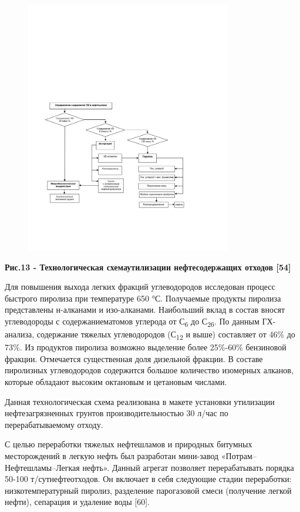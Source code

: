 \begin{figure}[H]
	\centering
	\includegraphics[width=0.8\textwidth]{media/chem2/image76}
	\caption*{}
\end{figure}


{\bfseries Рис.13 - Технологическая схемаутилизации нефтесодержащих
отходов {[}54{]}}

Для повышения выхода легких фракций углеводородов исследован процесс
быстрого пиролиза при температуре 650 °С. Получаемые продукты пиролиза
представлены н-алканами и изо-алканами. Наибольший вклад в состав вносят
углеводороды с содержаниематомов углерода от С\textsubscript{6} до
С\textsubscript{26}. По данным ГХ-анализа, содержание тяжелых
углеводородов (С\textsubscript{12} и выше) составляет от 46\% до 73\%.
Из продуктов пиролиза возможно выделение более 25\%-60\% бензиновой
фракции. Отмечается существенная доля дизельной фракции. В составе
пиролизных углеводородов содержится большое количество изомерных
алканов, которые обладают высоким октановым и цетановым числами.

Данная технологическая схема реализована в макете установки утилизации
нефтезагрязненных грунтов производительностью 30 л/час по
перерабатываемому отходу.

С целью переработки тяжелых нефтешламов и при­родных битумных
месторождений в легкую нефть был разработан мини-завод
«Потрам--Нефтешламы--Легкая нефть». Данный агрегат позволяет
перерабатывать поряд­ка 50-100 т/сутнефтеотходов. Он включает в себя
следую­щие стадии переработки: низкотемпературный пиролиз, разделение
парогазовой смеси (получение легкой нефти), сепарация и удаление воды
{[}60{]}.

